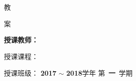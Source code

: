 \documentclass[scheme=chinese, heading = true, UTF8]{ctexart}
\begin{document}
\begin{titlepage}
  \begin{center}
    { \yihao \bf
      \makebox[10cm][s]{\nwsuaf}  \\
      \makebox[10cm][s]{\cie} \\
    }
    \vfill
    { \yihao \fangsong \fontsize{46pt}{80pt}
      \selectfont
      教\par
      案\par%
    }
    \par
    \vfill \vfill \sihao
    \setlength{\baselineskip}{1cm}
    \bf
    授课教师：\underline{\makebox[5cm]{\jsxmNR}}\par
    授课课程：\underline{\makebox[5cm]{\kcmcNR}}\par
    授课班级：\underline{\makebox[5cm]{\skbcNR}}\vfill
    {\bf 2017 }$\sim$ {\bf 2018}学年\hspace{0.5cm} 第~{\bf 一}~学期
  \end{center}
  \vfill
\end{titlepage}

\newpage
\restoregeometry
\newpage

\tableofcontents
\setcounter{page}{-0}
\thispagestyle{empty}

\xiaosi

\end{document}
